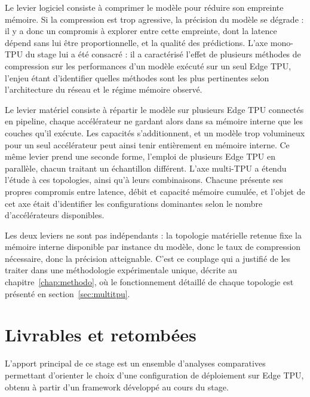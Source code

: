 \documentclass[11pt,a4paper]{report}
\begin{document}
Le levier logiciel consiste à comprimer le modèle pour réduire son empreinte mémoire. Si la compression est trop agressive, la précision du modèle se dégrade : il y a donc un compromis à explorer entre cette empreinte, dont la latence dépend sans lui être proportionnelle, et la qualité des prédictions. L'axe mono-TPU du stage lui a été consacré : il a caractérisé l'effet de plusieurs méthodes de compression sur les performances d'un modèle exécuté sur un seul Edge TPU, l'enjeu étant d'identifier quelles méthodes sont les plus pertinentes selon l'architecture du réseau et le régime mémoire observé.

Le levier matériel consiste à répartir le modèle sur plusieurs Edge TPU connectés en pipeline, chaque accélérateur ne gardant alors dans sa mémoire interne que les couches qu'il exécute. Les capacités s'additionnent, et un modèle trop volumineux pour un seul accélérateur peut ainsi tenir entièrement en mémoire interne. Ce même levier prend une seconde forme, l'emploi de plusieurs Edge TPU en parallèle, chacun traitant un échantillon différent. L'axe multi-TPU a étendu l'étude à ces topologies, ainsi qu'à leurs combinaisons. Chacune présente ses propres compromis entre latence, débit et capacité mémoire cumulée, et l'objet de cet axe était d'identifier les configurations dominantes selon le nombre d'accélérateurs disponibles.

Les deux leviers ne sont pas indépendants : la topologie matérielle retenue fixe la mémoire interne disponible par instance du modèle, donc le taux de compression nécessaire, donc la précision atteignable. C'est ce couplage qui a justifié de les traiter dans une méthodologie expérimentale unique, décrite au chapitre~\ref{chap:methodo}, où le fonctionnement détaillé de chaque topologie est présenté en section~\ref{sec:multitpu}.

\section{Livrables et retombées}

L'apport principal de ce stage est un ensemble d'analyses comparatives permettant d'orienter le choix d'une configuration de déploiement sur Edge TPU, obtenu à partir d'un framework développé au cours du stage.
\end{document}
